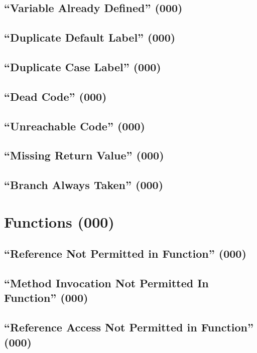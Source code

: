 \subsection{``Variable Already Defined'' (000)}

\subsection{``Duplicate Default Label'' (000)}

\subsection{``Duplicate Case Label'' (000)}

\subsection{``Dead Code'' (000)}

\subsection{``Unreachable Code'' (000)}

\subsection{``Missing Return Value'' (000)}

\subsection{``Branch Always Taken'' (000)}

\section{Functions (000)}

\subsection{``Reference Not Permitted in Function'' (000)}

\subsection{``Method Invocation Not Permitted In Function'' (000)}

\subsection{``Reference Access Not Permitted in Function'' (000)}


